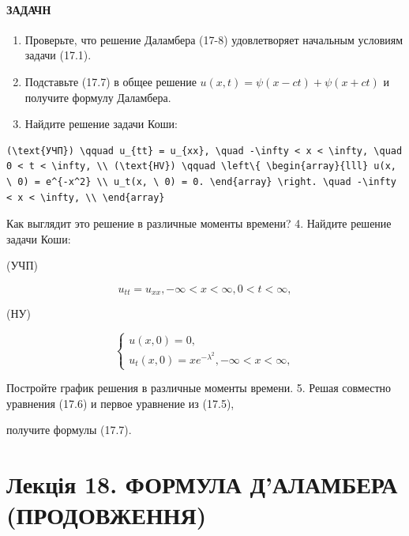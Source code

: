 \documentclass[
  ukrainian,
]{article}
\begin{document}
\paragraph{ЗАДАЧН}\label{ux437ux430ux434ux430ux447ux43d}

\begin{enumerate}
\def\labelenumi{\arabic{enumi}.}
\item
  Проверьте, что решение Даламбера (17-8) удовлетворяет начальным
  условиям задачи (17.1).
\item
  Подставьте (17.7) в общее решение
  \(u(x, t) = \psi(x - ct) + \psi(x + ct)\) и получите формулу
  Даламбера.
\item
  Найдите решение задачи Коши:
\end{enumerate}

\begin{verbatim}
(\text{УЧП}) \qquad u_{tt} = u_{xx}, \quad -\infty < x < \infty, \quad 0 < t < \infty, \\ (\text{HV}) \qquad \left\{ \begin{array}{lll} u(x, \ 0) = e^{-x^2} \\ u_t(x, \ 0) = 0. \end{array} \right. \quad -\infty < x < \infty, \\ \end{array}
\end{verbatim}

Как выглядит это решение в различные моменты времени? 4. Найдите решение
задачи Коши:

(УЧП)

\[
u_{tt} = u_{xx}, -\infty < x < \infty, 0 < t < \infty,
\]

(НУ)

\[
\begin{cases} u(x, 0) = 0, \\ u_t(x, 0) = xe^{-\lambda^2}, -\infty < x < \infty, \end{cases}
\]

Постройте график решения в различные моменты времени. 5. Решая совместно
уравнения (17.6) и первое уравнение из (17.5),

получите формулы (17.7).

\section{Лекція 18. ФОРМУЛА Д'АЛАМБЕРА
(ПРОДОВЖЕННЯ)}\label{ux43bux435ux43aux446ux456ux44f-18.-ux444ux43eux440ux43cux443ux43bux430-ux434ux430ux43bux430ux43cux431ux435ux440ux430-ux43fux440ux43eux434ux43eux432ux436ux435ux43dux43dux44f}
\end{document}
